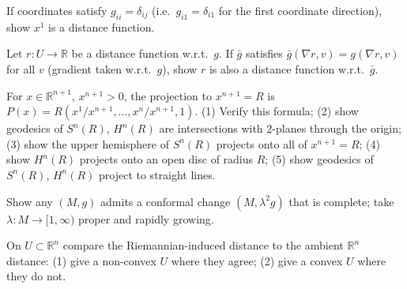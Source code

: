 \begin{remark}
  \label{rem:pet-ch5-ex-15}
  If coordinates satisfy $g_{ii}=\delta_{ij}$ (i.e.\ $g_{i1}=\delta_{i1}$ for the
  first coordinate direction), show $x^1$ is a distance function.
\end{remark}

\begin{remark}
  \label{rem:pet-ch5-ex-16}
  Let $r:U\to\mathbb R$ be a distance function w.r.t.\ $g$. If $\bar g$ satisfies
  $\bar g(\nabla r,v)=g(\nabla r,v)$ for all $v$ (gradient taken w.r.t.\ $g$), show
  $r$ is also a distance function w.r.t.\ $\bar g$.
\end{remark}

\begin{remark}
  \label{rem:pet-ch5-ex-17}
  For $x\in\mathbb R^{n+1}$, $x^{n+1}>0$, the projection to $x^{n+1}=R$ is
  $P(x)=R(x^1/x^{n+1},\dots,x^n/x^{n+1},1)$. (1) Verify this formula; (2) show
  geodesics of $S^n(R)$, $H^n(R)$ are intersections with $2$-planes through the
  origin; (3) show the upper hemisphere of $S^n(R)$ projects onto all of
  $x^{n+1}=R$; (4) show $H^n(R)$ projects onto an open disc of radius $R$; (5) show
  geodesics of $S^n(R)$, $H^n(R)$ project to straight lines.
\end{remark}

\begin{remark}
  \label{rem:pet-ch5-ex-18}
  Show any $(M,g)$ admits a conformal change $(M,\lambda^2g)$ that is complete;
  take $\lambda:M\to[1,\infty)$ proper and rapidly growing.
\end{remark}

\begin{remark}
  \label{rem:pet-ch5-ex-19}
  On $U\subset\mathbb R^n$ compare the Riemannian-induced distance to the ambient
  $\mathbb R^n$ distance: (1) give a non-convex $U$ where they agree; (2) give a
  convex $U$ where they do not.
\end{remark}

